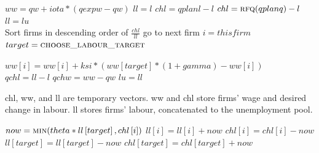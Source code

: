 \documentclass{article}
\begin{document}
\begin{algorithm}[H]
\caption{Labour Search}
    \begin{algorithmic}
        \State \(ww = qw + iota * (qexpw - qw)\)
        \State \(ll = l\)
        \State \(chl = qplanl - l\)
        \Else
        \State \(chl = \Call{rfq}{qplanq} - l\)
        \EndIf
        \EndFor
        \State \(ll = lu\)
        \\
        \State Sort firms in descending order of \(\frac{chl}{ll}\)
        \State go to next firm
        \EndIf
        \State \(i = this firm\)
        \State \(target = \Call{choose\_labour\_target}{}\)
        \State {}
    \end{algorithmic}
\end{algorithm}

\begin{algorithm}[H]
    \begin{algorithmic}
        \Else
            \State {}
        \Else
            \State \(ww\left[i\right] = ww\left[i\right] + ksi * (ww\left[target\right] * (1 + gamma) - ww\left[i\right])\)
            \EndIf
        \EndIf
        \EndFor
        \EndFor
        \\
        \State \(qchl = ll - l\)
        \State \(qchw = ww - qw\)
        \EndFor
        \State \(lu = ll\)
        \\
        \State {}
        \EndFor
        \EndFunction
    \end{algorithmic}
    \small chl, ww, and ll are temporary vectors.
    \small ww and chl store firms' wage and desired change in labour.
    \small ll stores firms' labour, concatenated to the unemployment pool.
\end{algorithm}

\begin{algorithm}[!htbp]
\caption{Handle Successful Attack}
    \begin{algorithmic}
        \State \(now = \Call{min}{theta * ll\left[target\right], chl\left[i\right]}\)
        \State \(ll\left[i\right] = ll\left[i\right] + now\)
        \State \(chl\left[i\right] = chl\left[i\right] - now\)
        \State \(ll\left[target\right] = ll\left[target\right] - now\)
            \State \(chl\left[target\right] = chl\left[target\right] + now\)
        \EndIf
        \EndFunction
    \end{algorithmic}
\end{algorithm}
\end{document}
